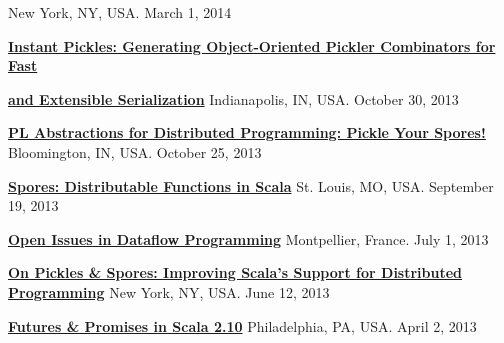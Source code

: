 \documentclass[9pt]{article}
\begin{document}
\medskip


\medskip
{}

 
\noindent\linebreak New York, NY, USA. March 1, 2014
\medskip

\noindent\raggedright \href{https://speakerdeck.com/heathermiller/instant-pickles-generating-object-oriented-pickler-combinators-for-fast-and-extensible-serialization}{\bf Instant Pickles: Generating Object-Oriented Pickler Combinators for Fast} \vspace{-0.03in}
\noindent\linebreak\raggedright \href{https://speakerdeck.com/heathermiller/instant-pickles-generating-object-oriented-pickler-combinators-for-fast-and-extensible-serialization}{\bf and Extensible Serialization}\dates{}
\noindent\linebreak Indianapolis, IN, USA. October 30, 2013
\medskip

\noindent\href{http://heather.miller.am/files/IU-PL-Abstractions-for-Dist-Programming.pdf}{\bf PL Abstractions for Distributed Programming: Pickle Your Spores!} 
\linebreak\noindent Bloomington, IN, USA. October 25, 2013
\medskip


\noindent\href{https://speakerdeck.com/heathermiller/spores-distributable-functions-in-scala}{\bf Spores: Distributable Functions in Scala} 
\noindent\linebreak St. Louis, MO, USA. September 19, 2013
\medskip

\noindent\href{http://heather.miller.am/files/LaME2013-Dataflow.pdf}{\bf Open Issues in Dataflow Programming} 
\linebreak\noindent Montpellier, France. July 1, 2013
\medskip


\noindent\href{https://speakerdeck.com/heathermiller/on-pickles-and-spores-improving-support-for-distributed-programming-in-scala}{\bf On Pickles \& Spores: Improving Scala's Support for Distributed Programming} \vspace{-0.03in}
\noindent\linebreak New York, NY, USA. June 12, 2013
\medskip

\noindent\href{http://lampwww.epfl.ch/~hmiller/files/Futures-Try-PhillyETE.pdf}{\bf Futures \& Promises in Scala 2.10} 
\linebreak\noindent Philadelphia, PA, USA. April 2, 2013
\medskip
\end{document}
